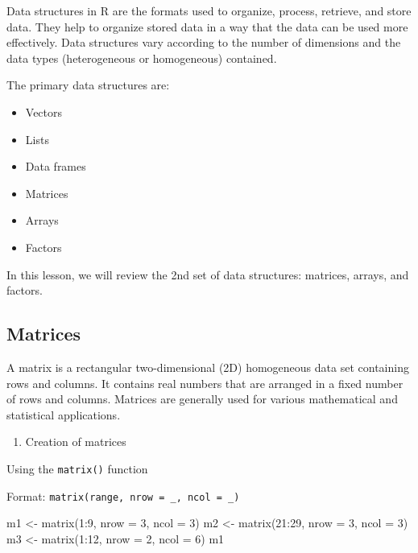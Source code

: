 \documentclass[
  letterpaper,
  DIV=11,
  numbers=noendperiod]{scrreprt}
\newenvironment{Shaded}{\begin{snugshade}}{\end{snugshade}}
\newcommand{\AttributeTok}[1]{\textcolor[rgb]{0.40,0.45,0.13}{#1}}
\newcommand{\DecValTok}[1]{\textcolor[rgb]{0.68,0.00,0.00}{#1}}
\newcommand{\FunctionTok}[1]{\textcolor[rgb]{0.28,0.35,0.67}{#1}}
\newcommand{\NormalTok}[1]{\textcolor[rgb]{0.00,0.23,0.31}{#1}}
\newcommand{\OtherTok}[1]{\textcolor[rgb]{0.00,0.23,0.31}{#1}}
\newcommand{\SpecialCharTok}[1]{\textcolor[rgb]{0.37,0.37,0.37}{#1}}
\providecommand{\tightlist}{%
  \setlength{\itemsep}{0pt}\setlength{\parskip}{0pt}}\usepackage{longtable,booktabs,array}
\begin{document}
Data structures in R are the formats used to organize, process,
retrieve, and store data. They help to organize stored data in a way
that the data can be used more effectively. Data structures vary
according to the number of dimensions and the data types (heterogeneous
or homogeneous) contained.

The primary data structures are:

\begin{itemize}
\item
  Vectors
\item
  Lists
\item
  Data frames
\item
  Matrices
\item
  Arrays
\item
  Factors
\end{itemize}

In this lesson, we will review the 2nd set of data structures: matrices,
arrays, and factors.

\subsection{Matrices}\label{matrices}

A matrix is a rectangular two-dimensional (2D) homogeneous data set
containing rows and columns. It contains real numbers that are arranged
in a fixed number of rows and columns. Matrices are generally used for
various mathematical and statistical applications.

\begin{enumerate}
\def\labelenumi{\alph{enumi}.}
\tightlist
\item
  Creation of matrices
\end{enumerate}

Using the \texttt{matrix()} function

Format: \texttt{matrix(range,\ nrow\ =\ \_,\ ncol\ =\ \_)}

\begin{Shaded}
\begin{Highlighting}[]
\NormalTok{m1 }\OtherTok{\textless{}{-}} \FunctionTok{matrix}\NormalTok{(}\DecValTok{1}\SpecialCharTok{:}\DecValTok{9}\NormalTok{, }\AttributeTok{nrow =} \DecValTok{3}\NormalTok{, }\AttributeTok{ncol =} \DecValTok{3}\NormalTok{)}
\NormalTok{m2 }\OtherTok{\textless{}{-}} \FunctionTok{matrix}\NormalTok{(}\DecValTok{21}\SpecialCharTok{:}\DecValTok{29}\NormalTok{, }\AttributeTok{nrow =} \DecValTok{3}\NormalTok{, }\AttributeTok{ncol =} \DecValTok{3}\NormalTok{)}
\NormalTok{m3 }\OtherTok{\textless{}{-}} \FunctionTok{matrix}\NormalTok{(}\DecValTok{1}\SpecialCharTok{:}\DecValTok{12}\NormalTok{, }\AttributeTok{nrow =} \DecValTok{2}\NormalTok{, }\AttributeTok{ncol =} \DecValTok{6}\NormalTok{)}
\NormalTok{m1}
\end{Highlighting}
\end{Shaded}
\end{document}
